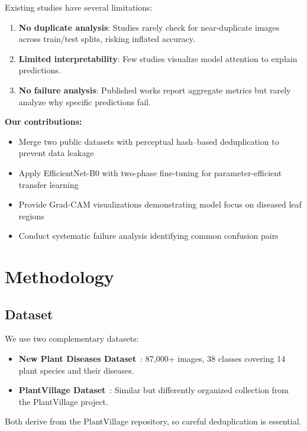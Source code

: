 \documentclass[12pt, a4paper]{article}
\begin{document}
Existing studies have several limitations:
\begin{enumerate}[noitemsep]
    \item \textbf{No duplicate analysis}: Studies rarely check for near-duplicate images across train/test splits, risking inflated accuracy.
    \item \textbf{Limited interpretability}: Few studies visualize model attention to explain predictions.
    \item \textbf{No failure analysis}: Published works report aggregate metrics but rarely analyze why specific predictions fail.
\end{enumerate}

\noindent\textbf{Our contributions:}
\begin{itemize}[noitemsep]
    \item Merge two public datasets with perceptual hash--based deduplication to prevent data leakage
    \item Apply EfficientNet-B0 with two-phase fine-tuning for parameter-efficient transfer learning
    \item Provide Grad-CAM visualizations demonstrating model focus on diseased leaf regions
    \item Conduct systematic failure analysis identifying common confusion pairs
\end{itemize}

\section{Methodology}

\subsection{Dataset}

We use two complementary datasets:
\begin{itemize}[noitemsep]
    \item \textbf{New Plant Diseases Dataset}~\cite{npd2020}: 87,000+ images, 38 classes covering 14 plant species and their diseases.
    \item \textbf{PlantVillage Dataset}~\cite{plantvillage2016}: Similar but differently organized collection from the PlantVillage project.
\end{itemize}

\noindent Both derive from the PlantVillage repository, so careful deduplication is essential.
\end{document}
